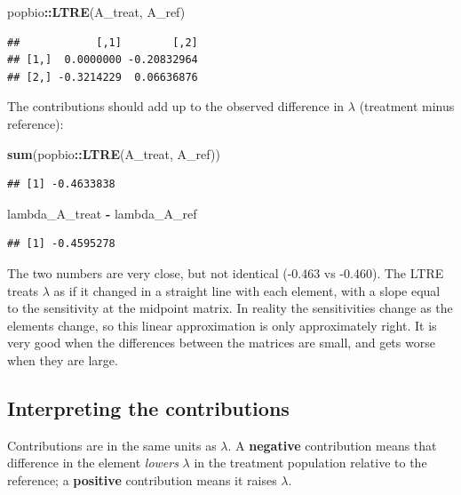 \documentclass[
  a4paper]{book}
\newenvironment{Shaded}{\begin{snugshade}}{\end{snugshade}}
\newcommand{\FunctionTok}[1]{\textcolor[rgb]{0.13,0.29,0.53}{\textbf{#1}}}
\newcommand{\NormalTok}[1]{#1}
\newcommand{\SpecialCharTok}[1]{\textcolor[rgb]{0.81,0.36,0.00}{\textbf{#1}}}
\begin{document}
\begin{Shaded}
\begin{Highlighting}[]
\NormalTok{popbio}\SpecialCharTok{::}\FunctionTok{LTRE}\NormalTok{(A\_treat, A\_ref)}
\end{Highlighting}
\end{Shaded}

\begin{verbatim}
##            [,1]        [,2]
## [1,]  0.0000000 -0.20832964
## [2,] -0.3214229  0.06636876
\end{verbatim}

The contributions should add up to the observed difference in \(\lambda\) (treatment minus reference):

\begin{Shaded}
\begin{Highlighting}[]
\FunctionTok{sum}\NormalTok{(popbio}\SpecialCharTok{::}\FunctionTok{LTRE}\NormalTok{(A\_treat, A\_ref))}
\end{Highlighting}
\end{Shaded}

\begin{verbatim}
## [1] -0.4633838
\end{verbatim}

\begin{Shaded}
\begin{Highlighting}[]
\NormalTok{lambda\_A\_treat }\SpecialCharTok{{-}}\NormalTok{ lambda\_A\_ref}
\end{Highlighting}
\end{Shaded}

\begin{verbatim}
## [1] -0.4595278
\end{verbatim}

The two numbers are very close, but not identical (-0.463 vs -0.460). The LTRE treats \(\lambda\) as if it changed in a straight line with each element, with a slope equal to the sensitivity at the midpoint matrix. In reality the sensitivities change as the elements change, so this linear approximation is only approximately right. It is very good when the differences between the matrices are small, and gets worse when they are large.

\subsection{Interpreting the contributions}\label{interpreting-the-contributions}

Contributions are in the same units as \(\lambda\). A \textbf{negative} contribution means that difference in the element \emph{lowers} \(\lambda\) in the treatment population relative to the reference; a \textbf{positive} contribution means it raises \(\lambda\).
\end{document}
